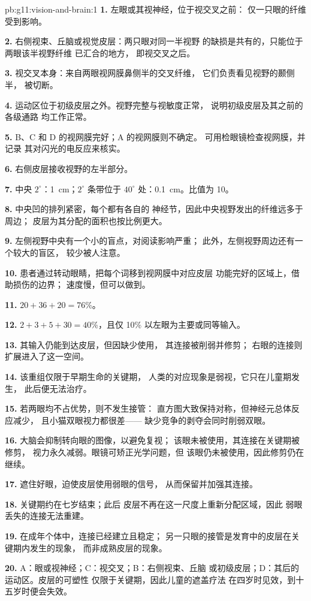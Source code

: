 \begin{solution}{pb:g11:vision-and-brain:1}
\textbf{1.} 左眼或其视神经，位于视交叉之前：
仅一只眼的纤维受到影响。

\textbf{2.} 右侧视束、丘脑或视觉皮层：两只眼对同一半视野
的缺损是共有的，只能位于两眼该半视野纤维
已汇合的地方，
即视交叉之后。

\textbf{3.} 视交叉本身：来自两眼视网膜鼻侧半的交叉纤维，
它们负责看见视野的颞侧半，
被切断。

\textbf{4.} 运动区位于初级皮层之外。视野完整与视敏度正常，
说明初级皮层及其之前的各级通路
均工作正常。

\textbf{5.} B、C 和 D 的视网膜完好；A 的视网膜则不确定。
可用检眼镜检查视网膜，并记录
其对闪光的电反应来核实。

\textbf{6.} 右侧皮层接收视野的左半部分。

\textbf{7.} 中央 $2^\circ$：\qty{1}{cm}；$2^\circ$ 条带位于
$40^\circ$ 处：\qty{0.1}{cm}。比值为 10。

\textbf{8.} 中央凹的排列紧密，每个都有各自的
神经节，因此中央视野发出的纤维远多于周边；
皮层为其分配的面积也按比例更大。

\textbf{9.} 左侧视野中央有一个小的盲点，对阅读影响严重；
此外，左侧视野周边还有一个较大的盲区，
较少被人注意。

\textbf{10.} 患者通过转动眼睛，把每个词移到视网膜中对应皮层
功能完好的区域上，借助损伤的边界；
速度慢，但可以做到。

\textbf{11.} $20 + 36 + 20 = 76\%$。

\textbf{12.} $2 + 3 + 5 + 30 = 40\%$，且仅 10\%
以左眼为主要或同等输入。

\textbf{13.} 其输入仍能到达皮层，但因缺少使用，
其连接被削弱并修剪；
右眼的连接则扩展进入了这一空间。

\textbf{14.} 该重组仅限于早期生命的关键期，
人类的对应现象是弱视，它只在儿童期发生，
此后便无法治疗。

\textbf{15.} 若两眼均不占优势，则不发生接管：
直方图大致保持对称，但神经元总体反应减少，
且小猫双眼视力都很差——
缺少竞争的剥夺会同时削弱双眼。

\textbf{16.} 大脑会抑制转向眼的图像，以避免复视；
该眼未被使用，其连接在关键期被修剪，
视力永久减弱。眼镜可矫正光学问题，但
该眼仍未被使用，因此修剪仍在继续。

\textbf{17.} 遮住好眼，迫使皮层使用弱眼的信号，
从而保留并加强其连接。

\textbf{18.} 关键期约在七岁结束；此后
皮层不再在这一尺度上重新分配区域，因此
弱眼丢失的连接无法重建。

\textbf{19.} 在成年个体中，连接已经建立且稳定；
另一只眼的接管是发育中的皮层在关键期内发生的现象，
而非成熟皮层的现象。

\textbf{20.} A：眼或视神经；C：视交叉；B：右侧视束、丘脑
或初级皮层；D：其后的运动区。皮层的可塑性
仅限于关键期，因此儿童的遮盖疗法
在四岁时见效，到十五岁时便会失效。
\end{solution}
